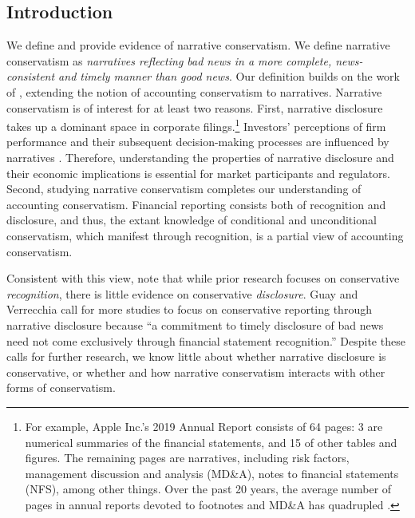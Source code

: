 \documentclass[letterpaper,12pt]{article}
\begin{document}
\begin{spacing}{1.5}
\section{Introduction}
\noindent We define and provide evidence of narrative conservatism. We define narrative conservatism as \textit{narratives reflecting bad news in a more complete, news-consistent and timely manner than good news}. Our definition builds on the work of , extending the notion of accounting conservatism to narratives. Narrative conservatism is of interest for at least two reasons. First, narrative disclosure takes up a dominant space in corporate filings.\footnote{For example, Apple Inc.'s 2019 Annual Report consists of 64 pages: 3 are numerical summaries of the financial statements, and 15 of other tables and figures. The remaining pages are narratives, including risk factors, management discussion and analysis (MD\&A), notes to financial statements (NFS), among other things. Over the past 20 years, the average number of pages in annual reports devoted to footnotes and MD\&A has quadrupled \cite{eyPointNowTime2012}.} Investors' perceptions of firm performance and their subsequent decision-making processes are influenced by narratives \cite{liTextualAnalysisCorporate2011}. Therefore, understanding the properties of narrative disclosure and their economic implications is essential for market participants and regulators. Second, studying narrative conservatism completes our understanding of accounting conservatism. Financial reporting consists both of recognition and disclosure, and thus, the extant knowledge of conditional and unconditional conservatism, which manifest through recognition, is a partial view of accounting conservatism. 

Consistent with this view,  note that while prior research focuses on conservative \textit{recognition}, there is little evidence on conservative \textit{disclosure}. Guay and Verrecchia \citeyear[pp. 73-74]{guayConservativeDisclosure2018} call for more studies to focus on conservative reporting through narrative disclosure because ``a commitment to timely disclosure of bad news need not come exclusively through financial statement recognition.'' Despite these calls for further research, we know little about whether narrative disclosure is conservative, or whether and how narrative conservatism interacts with other forms of conservatism.


\end{spacing}
\end{document}
